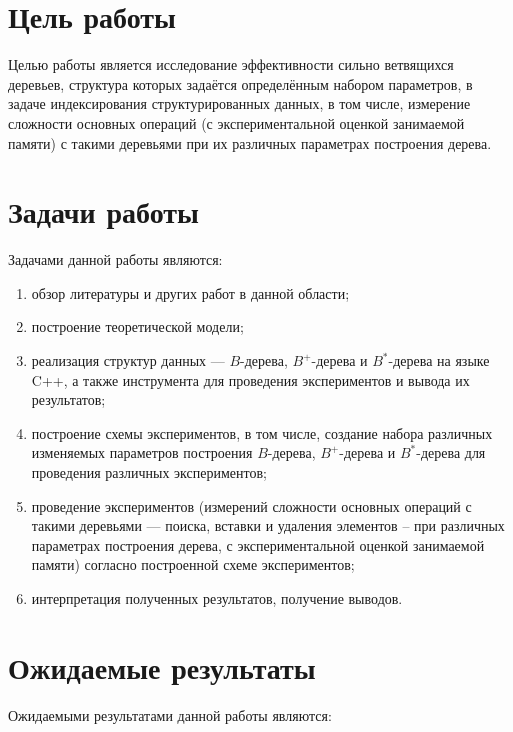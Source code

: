 \documentclass{llncs}
\begin{document}
	\section{Цель работы}
	
	Целью работы является исследование эффективности сильно ветвящихся деревьев, структура которых задаётся определённым набором параметров, в задаче индексирования структурированных данных, в том числе, измерение сложности основных операций (с экспериментальной оценкой занимаемой памяти) с такими деревьями при их различных параметрах построения дерева.
	
	\section{Задачи работы}
	
	Задачами данной работы являются:
	
	\begin{enumerate}
		\item обзор литературы и других работ в данной области;
		\item построение теоретической модели;
		\item реализация структур данных --- $B$-дерева, $B^+$-дерева и $B^*$-дерева на языке C++, а также инструмента для проведения экспериментов и вывода их результатов;
		\item построение схемы экспериментов, в том числе, создание набора различных изменяемых параметров построения $B$-дерева, $B^+$-дерева и $B^*$-дерева для проведения различных экспериментов;
		\item проведение экспериментов (измерений сложности основных операций с такими деревьями --- поиска, вставки и удаления элементов – при различных параметрах построения дерева, с экспериментальной оценкой занимаемой памяти) согласно построенной схеме экспериментов;
		\item интерпретация полученных результатов, получение выводов.
	\end{enumerate}
	
	\section{Ожидаемые результаты}
	
	Ожидаемыми результатами данной работы являются:
	
\end{document}
